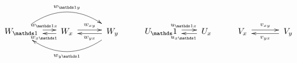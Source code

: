 \begin{align}
\xymatrix @!0 @M=2mm @R=22mm @C=19mm{
W_{\unit} \ar@/^2pc/[rr]^{w_{\unit y }} \ar@<.5ex>[r]^{w_{\unit x}}
& W_x \ar@<.5ex>[l]^{w_{x \unit }} \ar@<.5ex>[r]^{w_{xy}}
& W_y\ar@<.5ex>[l]^{w_{yx}} \ar@/^2pc/[ll]^{w_{y\unit}}
}\qquad
\xymatrix @!0 @M=2mm @R=22mm @C=19mm{
U_\unit\ar@<.5ex>[r]^{u_{\unit x}}
& U_x \ar@<.5ex>[l]^{u_{x \unit}} 
}\qquad
\xymatrix @!0 @M=2mm @R=22mm @C=19mm{
V_x\ar@<.5ex>[r]^{v_{xy}}
& V_y \ar@<.5ex>[l]^{v_{yx}} 
}
\end{align}



